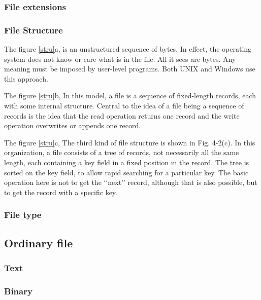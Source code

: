 \subsubsection{File extensions}

\subsubsection{File Structure}

The figure \ref{stru}a, is an unstructured sequence of bytes. In effect, the operating system does not know or care what is in the file. All it sees are bytes. Any meaning must be imposed by user-level programs. Both UNIX and Windows use this approach.

The figure \ref{stru}b, In this model, a file is a sequence of fixed-length records, each with some internal structure. Central to the idea of a file being a sequence of records is the idea that the read operation returns one record and the write operation overwrites or appends one record.

The figure \ref{stru}c, The third kind of file structure is shown in Fig. 4-2(c). In this organization, a file consists of a tree of records, not necessarily all the same length, each containing a key field in a fixed position in the record. The tree is sorted on the key field, to allow rapid searching for a particular key. The basic operation here is not to get the ‘‘next’’ record, although that is also possible, but to get the record with a specific key.

\subsubsection{File type}



\subsection{Ordinary file}
\subsubsection{Text}
\subsubsection{Binary}
